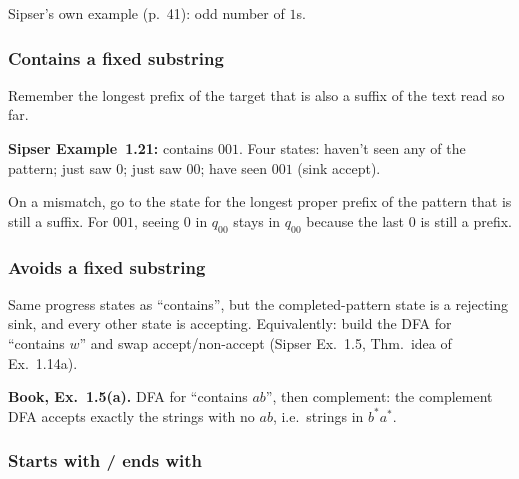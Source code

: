 \documentclass[11pt,a4paper]{article}
\begin{document}
Sipser's own example (p.~41): odd number of $1$s.

\subsubsection{Contains a fixed substring}

Remember the longest prefix of the target that is also a suffix of the
text read so far.

\textbf{Sipser Example~1.21:} contains $001$. Four states:
haven't seen any of the pattern; just saw $0$; just saw $00$; have seen
$001$ (sink accept).

\begin{center}
\end{center}

On a mismatch, go to the state for the longest proper prefix of the
pattern that is still a suffix. For $001$, seeing $0$ in $q_{00}$ stays
in $q_{00}$ because the last $0$ is still a prefix.

\subsubsection{Avoids a fixed substring}

Same progress states as ``contains'', but the completed-pattern state is a
rejecting sink, and every other state is accepting. Equivalently: build
the DFA for ``contains $w$'' and swap accept/non-accept
(Sipser Ex.~1.5, Thm.~idea of Ex.~1.14a).

\textbf{Book, Ex.~1.5(a).} DFA for ``contains $ab$'', then complement:
the complement DFA accepts exactly the strings with no $ab$, i.e.\
strings in $b^*a^*$.

\subsubsection{Starts with / ends with}
\end{document}
